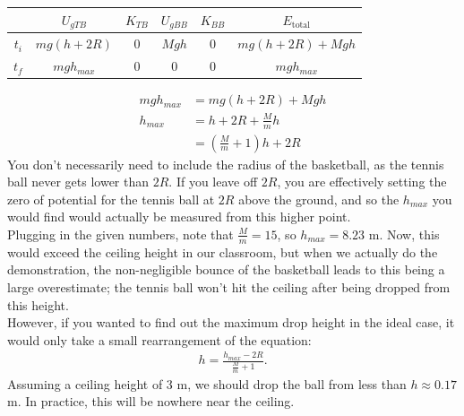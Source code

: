 \documentclass[]{article}
\begin{document}
\begin{TeacherMargin}
\begin{center}
\begin{tabular}{c||c|c|c|c||c}
	& $U_{gTB}$ & $K_{TB}$ & $U_{gBB}$ & $K_{BB}$ & $E_{\text{total}}$ \\ \hline
	$t_{i}$ & $mg(h+2R)$ & $0$ & $Mgh$ & $0$ & $mg(h+2R)+Mgh$ \\ \hline
	$t_{f}$ & $mgh_{max}$ & $0$ & $0$ & $0$ & $mgh_{max}$
\end{tabular}
\end{center}
\begin{align*}
	mgh_{max} & = mg(h+2R) + Mgh \\
	h_{max} & = h + 2R + \frac{M}{m}h \\
	& = \left(\frac{M}{m}+1\right)h+2R
\end{align*}
You don't necessarily need to include the radius of the basketball, as the tennis ball never gets lower than $2R$. If you leave off $2R$, you are effectively setting the zero of potential for the tennis ball at $2R$ above the ground, and so the $h_{max}$ you would find would actually be measured from this higher point. \\

\noindent Plugging in the given numbers, note that $\frac{M}{m}=15$, so $h_{max} = 8.23$ m. Now, this would exceed the ceiling height in our classroom, but when we actually do the demonstration, the non-negligible bounce of the basketball leads to this being a large overestimate; the tennis ball won't hit the ceiling after being dropped from this height. \\

\noindent However, if you wanted to find out the maximum drop height in the ideal case, it would only take a small rearrangement of the equation:
\begin{align*}
	h = \frac{h_{max}-2R}{\frac{M}{m}+1}.
\end{align*}
Assuming a ceiling height of 3 m, we should drop the ball from less than $h \approx 0.17$ m. In practice, this will be nowhere near the ceiling.
\end{TeacherMargin}
\end{document}
